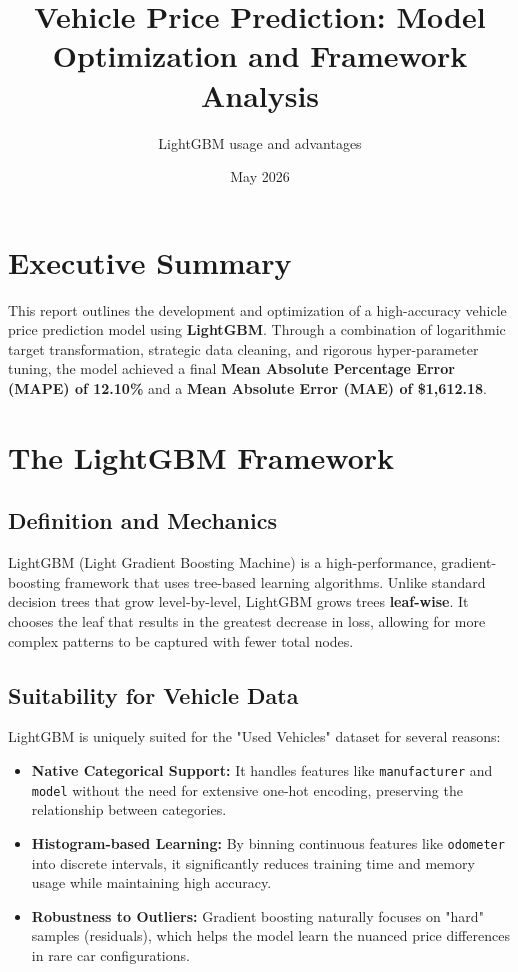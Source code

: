 \documentclass[11pt]{article}
\title{\textbf{Vehicle Price Prediction: Model Optimization and Framework Analysis}}
\author{LightGBM usage and advantages}
\date{May 2026}
\begin{document}
\maketitle

\section{Executive Summary}
This report outlines the development and optimization of a high-accuracy vehicle price prediction model using \textbf{LightGBM}. Through a combination of logarithmic target transformation, strategic data cleaning, and rigorous hyper-parameter tuning, the model achieved a final \textbf{Mean Absolute Percentage Error (MAPE) of 12.10\%} and a \textbf{Mean Absolute Error (MAE) of \$1,612.18}.

\section{The LightGBM Framework}

\subsection{Definition and Mechanics}
LightGBM (Light Gradient Boosting Machine) is a high-performance, gradient-boosting framework that uses tree-based learning algorithms. Unlike standard decision trees that grow level-by-level, LightGBM grows trees \textbf{leaf-wise}. It chooses the leaf that results in the greatest decrease in loss, allowing for more complex patterns to be captured with fewer total nodes.



\subsection{Suitability for Vehicle Data}
LightGBM is uniquely suited for the "Used Vehicles" dataset for several reasons:
\begin{itemize}
    \item \textbf{Native Categorical Support:} It handles features like \texttt{manufacturer} and \texttt{model} without the need for extensive one-hot encoding, preserving the relationship between categories.
    \item \textbf{Histogram-based Learning:} By binning continuous features like \texttt{odometer} into discrete intervals, it significantly reduces training time and memory usage while maintaining high accuracy.
    \item \textbf{Robustness to Outliers:} Gradient boosting naturally focuses on "hard" samples (residuals), which helps the model learn the nuanced price differences in rare car configurations.
\end{itemize}
\end{document}
